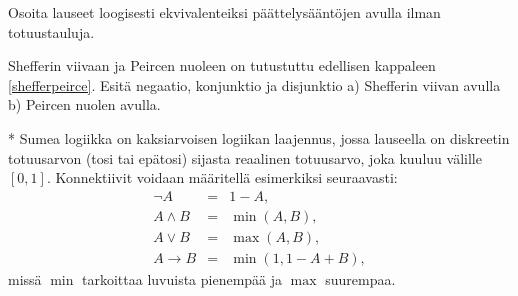 \begin{kotitehtavasivu}
\begin{tehtava}
	Osoita lauseet loogisesti ekvivalenteiksi
	päättelysääntöjen avulla ilman totuustauluja.
\end{tehtava}

\begin{tehtava}
	Shefferin viivaan ja Peircen nuoleen on tutustuttu
	edellisen kappaleen \ref{shefferpeirce}. Esitä negaatio,
	konjunktio ja disjunktio a) Shefferin viivan avulla b)
	Peircen nuolen avulla.
	
	\begin{vastaus}
	\end{vastaus}
\end{tehtava}

\begin{tehtava}
	* Sumea logiikka on kaksiarvoisen logiikan
	laajennus, jossa lauseella on diskreetin totuusarvon
	(tosi tai epätosi) sijasta reaalinen totuusarvo, joka
	kuuluu välille $[0, 1]$. Konnektiivit voidaan määritellä
	esimerkiksi seuraavasti:
	\[
	\begin{array}{rcl}
	\lnot A &=& 1-A,\\
	A\land B &=& \min(A, B),\\
	A\lor B &=& \max(A, B),\\
	A\to B
	&=& \min(1, 1-A+B),
	\end{array}
	\]
	missä $\min$ tarkoittaa luvuista pienempää ja $\max$
	suurempaa.


\end{tehtava}
\end{kotitehtavasivu}
